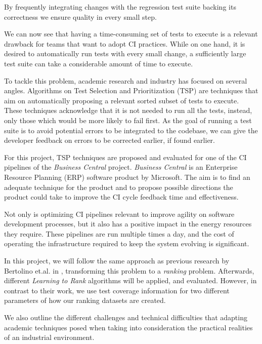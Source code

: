 By frequently integrating changes with the regression test suite backing its correctness
we ensure quality in every small step.

We can now see that having a time-consuming set of tests to execute is a relevant 
drawback for teams that want to adopt CI practices. While on one hand, it is desired
to automatically run tests with every small change, a sufficiently large test suite
can take a considerable amount of time to execute.

To tackle this problem, academic research and industry has focused on several angles.
Algorithms on Test Selection and Prioritization (TSP) are techniques that aim on 
automatically proposing a relevant sorted subset of tests to execute. These techniques
acknowledge that it is not needed to run all the tests, instead, only
those which would be more likely to fail first. As the goal of running a test suite is to
avoid potential errors to be integrated to the codebase, we can give the developer 
feedback on errors to be corrected earlier, if found earlier.

For this project, TSP techniques are proposed and evaluated for one of the CI pipelines
of the \emph{Business Central} project. \emph{Business Central} is an Enterprise Resource Planning (ERP)
software product by Microsoft. The aim is to find an adequate technique
for the product and to propose possible directions the product could take to improve the
CI cycle feedback time and effectiveness.

Not only is optimizing CI pipelines relevant to improve agility on software development
processes, but it also has a positive impact in the energy resources they require.
These pipelines are run multiple times a day, and the cost of operating the infrastructure
required to keep the system evolving is significant.

In this project, we will follow the same approach as previous research by Bertolino
et.al. in \cite{Bertolino2020LearningtoRankVR}, transforming this problem to a \emph{ranking} problem.
Afterwards, different \emph{Learning to Rank} algorithms will be applied, and evaluated.
However, in contrast to their work, we use test coverage information for two different 
parameters of how our ranking datasets are created.


We also outline the different challenges and technical difficulties that adapting
academic techniques posed when taking into consideration the practical realities
of an industrial environment. 


